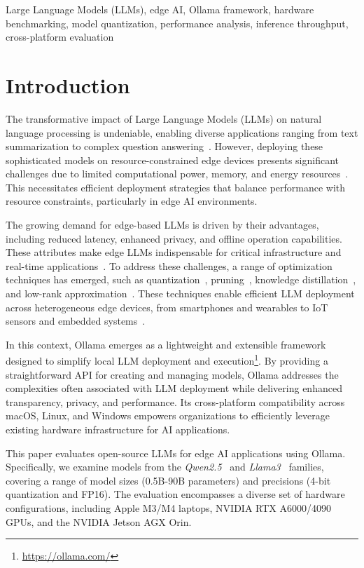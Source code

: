 \documentclass[conference]{IEEEtran}
\begin{document}
\begin{IEEEkeywords}
Large Language Models (LLMs), edge AI, Ollama framework, hardware benchmarking, model quantization,  performance analysis, inference throughput, cross-platform evaluation
\end{IEEEkeywords}

\section{Introduction}

The transformative impact of Large Language Models (LLMs) on natural language processing is undeniable, enabling diverse applications ranging from text summarization to complex question answering~\cite{zheng2024review}. However, deploying these sophisticated models on resource-constrained edge devices presents significant challenges due to limited computational power, memory, and energy resources~\cite{dhar2024empirical, zheng2024review}. This necessitates efficient deployment strategies that balance performance with resource constraints, particularly in edge AI environments.

The growing demand for edge-based LLMs is driven by their advantages, including reduced latency, enhanced privacy, and offline operation capabilities. These attributes make edge LLMs indispensable for critical infrastructure and real-time applications~\cite{zheng2024review}. To address these challenges, a range of optimization techniques has emerged, such as quantization~\cite{kim2024shortened, frantar2022optimal}, pruning~\cite{kim2024shortened, frantar2022optimal,yang2022distilling}, knowledge distillation~\cite{gu2023minillm, yang2022distilling}, and low-rank approximation~\cite{ji2024agile}. These techniques enable efficient LLM deployment across heterogeneous edge devices, from smartphones and wearables to IoT sensors and embedded systems~\cite{zheng2024review}.

In this context, Ollama emerges as a lightweight and extensible framework designed to simplify local LLM deployment and execution\footnote{\url{https://ollama.com/}}. By providing a straightforward API for creating and managing models, Ollama addresses the complexities often associated with LLM deployment while delivering enhanced transparency, privacy, and performance. Its cross-platform compatibility across macOS, Linux, and Windows empowers organizations to efficiently leverage existing hardware infrastructure for AI applications.

This paper evaluates open-source LLMs for edge AI applications using Ollama. Specifically, we examine models from the \textit{Qwen2.5}~\cite{yang2024qwen2} and \textit{Llama3}~\cite{grattafiori2024llama3} families, covering a range of model sizes (0.5B-90B parameters) and precisions (4-bit quantization and FP16). The evaluation encompasses a diverse set of hardware configurations, including Apple M3/M4 laptops, NVIDIA RTX A6000/4090 GPUs, and the NVIDIA Jetson AGX Orin.
\end{document}
